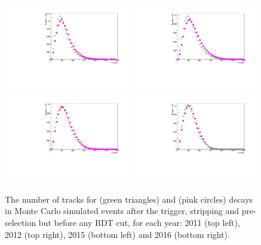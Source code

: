 \begin{figure}[ht]
  \centering
    \includegraphics[width=0.49\textwidth]{Figs/LifetimeMeasurement/nTracks_2011_Bd2KPi_Bs2MuMu_Dec_triggers.pdf}
    \includegraphics[width=0.49\textwidth]{Figs/LifetimeMeasurement/nTracks_2012_Bd2KPi_Bs2MuMu_Dec_triggers.pdf}
    \includegraphics[width=0.49\textwidth]{Figs/LifetimeMeasurement/nTracks_2015_Bd2KPi_Bs2MuMu_Dec_triggers.pdf}
    \includegraphics[width=0.49\textwidth]{Figs/LifetimeMeasurement/nTracks_2016_Bd2KPi_Bs2MuMu_Dec_triggers.pdf}
  \caption{The number of tracks for \bdkpi (green triangles) and \bsmumu (pink circles) decays in Monte Carlo simulated events after the trigger, stripping and pre-selection but before any BDT cut, for each year: 2011 (top left), 2012 (top right), 2015 (bottom left) and 2016 (bottom right). }
  \label{fig:BsmmVsBdToKpinTracks}
\end{figure}

